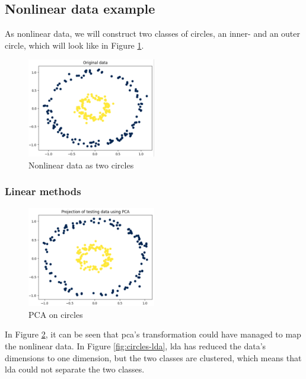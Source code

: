 \subsection{Nonlinear data example}\label{subsec:nonlinear-data-example}
As nonlinear data, we will construct two classes of circles, an inner- and an outer circle, which will look like in Figure \ref{fig:circles}.

\begin{figure}[htb!]
    \centering
    \includegraphics[width=0.5\textwidth]{figures/theory-example-figures/fig-circles.png}
    \caption{Nonlinear data as two circles}
    \label{fig:circles}
\end{figure}

\subsubsection{Linear methods}\label{subsubsec:linear-methods-on-circles}
\begin{figure}[htb!]
    \centering
    \includegraphics[width=0.5\textwidth]{figures/theory-example-figures/circles-pca.png}
    \caption{PCA on circles}
    \label{fig:circles-pca}
\end{figure}

In Figure \ref{fig:circles-pca}, it can be seen that \gls{pca}'s transformation could have managed to map the nonlinear data. In Figure \ref{fig:circles-lda}, \gls{lda} has reduced the data's dimensions to one dimension, but the two classes are clustered, which means that \gls{lda} could not separate the two classes.

